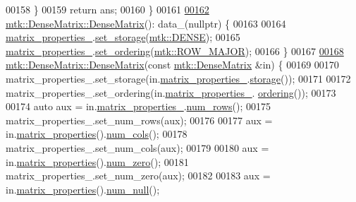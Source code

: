 \begin{DoxyCode}
00158   \}
00159   \textcolor{keywordflow}{return} ans;
00160 \}
00161 
\hypertarget{mtk__dense__matrix_8cc_source_l00162}{}\hyperlink{classmtk_1_1DenseMatrix_a0c75ee704707983f935b02835eab0933}{00162} \hyperlink{classmtk_1_1DenseMatrix_a0c75ee704707983f935b02835eab0933}{mtk::DenseMatrix::DenseMatrix}(): data\_(nullptr) \{
00163 
00164   \hyperlink{classmtk_1_1DenseMatrix_a481c8d09af685a5ba67acefdcaa810cc}{matrix\_properties\_}.\hyperlink{classmtk_1_1Matrix_ac0edd0ee07853d0ef6dea9b08d15e132}{set\_storage}(\hyperlink{namespacemtk_ga25b67ec6a2afeee69f9bb196a9c66619a00a806d43a7d74e9ccca47a2134e9c87}{mtk::DENSE});
00165   \hyperlink{classmtk_1_1DenseMatrix_a481c8d09af685a5ba67acefdcaa810cc}{matrix\_properties\_}.\hyperlink{classmtk_1_1Matrix_aa390fa8883e58e8f1df9416e5b5b7a83}{set\_ordering}(\hyperlink{namespacemtk_ga622801bd9f912d0f976c3e383f5f581cabc55178ac16eb1ce89b5f3ab915a91f3}{mtk::ROW\_MAJOR});
00166 \}
00167 
\hypertarget{mtk__dense__matrix_8cc_source_l00168}{}\hyperlink{classmtk_1_1DenseMatrix_a90102d605a668bf7ecf0d766cc4c10db}{00168} \hyperlink{classmtk_1_1DenseMatrix_a0c75ee704707983f935b02835eab0933}{mtk::DenseMatrix::DenseMatrix}(\textcolor{keyword}{const} 
      \hyperlink{classmtk_1_1DenseMatrix}{mtk::DenseMatrix} &in) \{
00169 
00170   matrix\_properties\_.set\_storage(in.\hyperlink{classmtk_1_1DenseMatrix_a481c8d09af685a5ba67acefdcaa810cc}{matrix\_properties\_}.\hyperlink{classmtk_1_1Matrix_a21893fc643eebadd9757c8995cf44dd3}{storage}());
00171 
00172   matrix\_properties\_.set\_ordering(in.\hyperlink{classmtk_1_1DenseMatrix_a481c8d09af685a5ba67acefdcaa810cc}{matrix\_properties\_}.
      \hyperlink{classmtk_1_1Matrix_af675e480c7b94f194aadad316e53b002}{ordering}());
00173 
00174   \textcolor{keyword}{auto} aux = in.\hyperlink{classmtk_1_1DenseMatrix_a481c8d09af685a5ba67acefdcaa810cc}{matrix\_properties\_}.\hyperlink{classmtk_1_1Matrix_a69feb30fc0018faee65fe9f7cb43e0ed}{num\_rows}();
00175   matrix\_properties\_.set\_num\_rows(aux);
00176 
00177   aux = in.\hyperlink{classmtk_1_1DenseMatrix_abb5e4db5688743c6f9fd9ec6e38ed4ca}{matrix\_properties}().\hyperlink{classmtk_1_1Matrix_a1e52243fa290de6ee4bcc48cd1776a9a}{num\_cols}();
00178   matrix\_properties\_.set\_num\_cols(aux);
00179 
00180   aux = in.\hyperlink{classmtk_1_1DenseMatrix_abb5e4db5688743c6f9fd9ec6e38ed4ca}{matrix\_properties}().\hyperlink{classmtk_1_1Matrix_a78e1f8449a21db53750e083c6802a993}{num\_zero}();
00181   matrix\_properties\_.set\_num\_zero(aux);
00182 
00183   aux = in.\hyperlink{classmtk_1_1DenseMatrix_abb5e4db5688743c6f9fd9ec6e38ed4ca}{matrix\_properties}().\hyperlink{classmtk_1_1Matrix_a5bf58512ee91d6ab80eb94541072a9cf}{num\_null}();

\end{DoxyCode}
